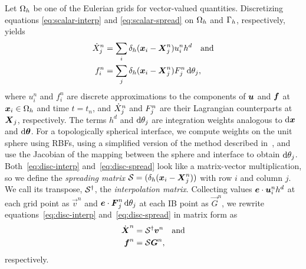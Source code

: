 Let $\Omega_h$ be one of the Eulerian grids for vector-valued quantities. Discretizing
equations \eqref{eq:scalar-interp} and \eqref{eq:scalar-spread} on $\Omega_h$ and
$\Gamma_h$, respectively, yields
\begin{align}
    \label{eq:disc-interp}
    \dot{X}^n_j &= \sum_i \delta_h(\x_i-\X^n_j)u^n_i h^d \quad \text{and} \\
    \label{eq:disc-spread}
    f^n_i &= \sum_j \delta_h(\x_i-\X^n_j)F^n_j \d\theta_j,
\end{align}
where $u^n_i$ and $f^n_i$ are discrete approximations to the components of $\boldsymbol{u}$ and $\boldsymbol{f}$
at $\boldsymbol{x}_i\in\Omega_h$ and time $t=t_n$, and $\dot{X}^n_{\smash j}$ and $F^n_{\smash j}$
are their Lagrangian counterparts at $\boldsymbol{X}_{\smash j}$, respectively. The terms $h^d$ and
$\d\theta_{\smash j}$ are integration weights analogous to $\d\x$ and $\d\params$. For
a topologically spherical interface, we compute weights on the unit sphere using RBFs,
using a simplified version of the method described in~\cite{Fuselier:2013coba}, and use
the Jacobian of the mapping between the sphere and interface to obtain
$\d\theta_{\smash j}$. Both~\eqref{eq:disc-interp} and~\eqref{eq:disc-spread} look like a
matrix-vector multiplication, so we define the \emph{spreading matrix}
$\mathcal{S}=(\delta_h(\boldsymbol{x}_i-\boldsymbol{X}^n_{\smash j}))$ with row $i$ and column $j$. We call its
transpose, $\mathcal{S}^\dagger$, the \emph{interpolation matrix}. Collecting values
$\boldsymbol{e}\cdot\boldsymbol{u}^n_ih^d$ at each grid point as $\vec{v}^n$ and
$\e\cdot\F^n_{\smash j}\d\theta_{\smash j}$ at each IB point as $\vec{G}^n$, we
rewrite equations~\eqref{eq:disc-interp} and~\eqref{eq:disc-spread} in matrix form as
\begin{align}
    \label{eq:matrix-interp}%
    \U^n &= \interp{\vec{v}}^n \quad\text{and} \\
    \label{eq:matrix-spread}%
    \f^n &= \spread{\vec{G}}^n,
\end{align}
respectively.

